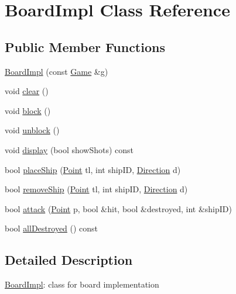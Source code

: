 \hypertarget{class_board_impl}{}\section{Board\+Impl Class Reference}
\label{class_board_impl}
\subsection*{Public Member Functions}
\begin{DoxyCompactItemize}
\item 
\mbox{\hyperlink{class_board_impl_a2c3f1cce7def17781c0025d1e68d0af5}{Board\+Impl}} (const \mbox{\hyperlink{class_game}{Game}} \&g)
\item 
void \mbox{\hyperlink{class_board_impl_a47c7733ed5ec7a09fe9710f443fe0952}{clear}} ()
\item 
void \mbox{\hyperlink{class_board_impl_abd7743ed758876c2855b2bb7474cf2eb}{block}} ()
\item 
void \mbox{\hyperlink{class_board_impl_a36defeb0096154a4606442da9122c810}{unblock}} ()
\item 
void \mbox{\hyperlink{class_board_impl_a4b600b257cfe79f10ac8792ab69eb388}{display}} (bool show\+Shots) const
\item 
bool \mbox{\hyperlink{class_board_impl_af0fd0226fc1f401374a0cbbfbab98769}{place\+Ship}} (\mbox{\hyperlink{class_point}{Point}} tl, int ship\+ID, \mbox{\hyperlink{_globals_8h_a224b9163917ac32fc95a60d8c1eec3aa}{Direction}} d)
\item 
bool \mbox{\hyperlink{class_board_impl_a8573ccd5fb2a837f324cc0f190cece5d}{remove\+Ship}} (\mbox{\hyperlink{class_point}{Point}} tl, int ship\+ID, \mbox{\hyperlink{_globals_8h_a224b9163917ac32fc95a60d8c1eec3aa}{Direction}} d)
\item 
bool \mbox{\hyperlink{class_board_impl_afd58266f5c81679fef78c0d1abb9d0d5}{attack}} (\mbox{\hyperlink{class_point}{Point}} p, bool \&hit, bool \&destroyed, int \&ship\+ID)
\item 
bool \mbox{\hyperlink{class_board_impl_a00ae397df7ab1a47868078a2e0ec54b8}{all\+Destroyed}} () const
\end{DoxyCompactItemize}


\subsection{Detailed Description}
\mbox{\hyperlink{class_board_impl}{Board\+Impl}}\+: class for board implementation 

